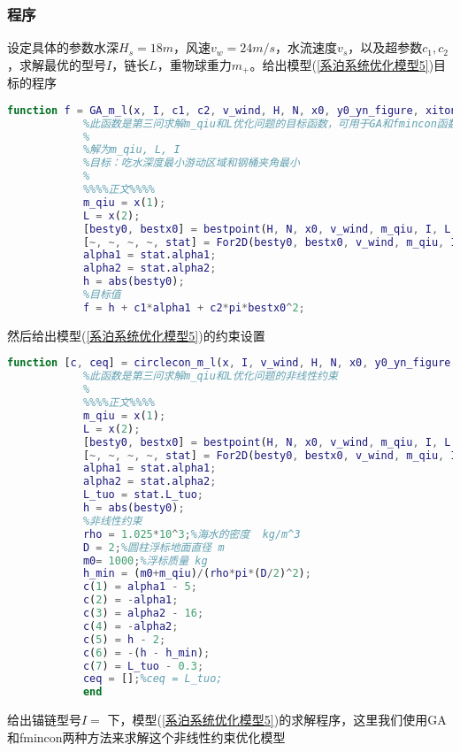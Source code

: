         \subsubsection{程序}
            \par
            设定具体的参数水深$H_s=18m$，风速$v_w=24m/s$，水流速度$v_s$，以及超参数$c_1,c_2$，求解最优的型号$I$，链长$L$，重物球重力$m_+$。给出模型(\ref{系泊系统优化模型5})目标的程序
            \begin{lstlisting}[language = Matlab]
            function f = GA_m_l(x, I, c1, c2, v_wind, H, N, x0, y0_yn_figure, xitong_figure)
            %此函数是第三问求解m_qiu和L优化问题的目标函数，可用于GA和fmincon函数。
            %
            %解为m_qiu, L, I
            %目标：吃水深度最小游动区域和钢桶夹角最小
            %
            %%%%正文%%%%
            m_qiu = x(1);
            L = x(2);
            [besty0, bestx0] = bestpoint(H, N, x0, v_wind, m_qiu, I, L, y0_yn_figure);
            [~, ~, ~, ~, stat] = For2D(besty0, bestx0, v_wind, m_qiu, I, L, xitong_figure);
            alpha1 = stat.alpha1;
            alpha2 = stat.alpha2;
            h = abs(besty0);
            %目标值
            f = h + c1*alpha1 + c2*pi*bestx0^2;
            \end{lstlisting}
            然后给出模型(\ref{系泊系统优化模型5})的约束设置
            \begin{lstlisting}[language = Matlab]
            function [c, ceq] = circlecon_m_l(x, I, v_wind, H, N, x0, y0_yn_figure, xitong_figure)
            %此函数是第三问求解m_qiu和L优化问题的非线性约束
            %
            %%%%正文%%%%
            m_qiu = x(1);
            L = x(2);
            [besty0, bestx0] = bestpoint(H, N, x0, v_wind, m_qiu, I, L, y0_yn_figure);
            [~, ~, ~, ~, stat] = For2D(besty0, bestx0, v_wind, m_qiu, I, L, xitong_figure);
            alpha1 = stat.alpha1;
            alpha2 = stat.alpha2;
            L_tuo = stat.L_tuo;
            h = abs(besty0);
            %非线性约束
            rho = 1.025*10^3;%海水的密度  kg/m^3
            D = 2;%圆柱浮标地面直径 m
            m0= 1000;%浮标质量 kg
            h_min = (m0+m_qiu)/(rho*pi*(D/2)^2);
            c(1) = alpha1 - 5;
            c(2) = -alpha1;
            c(3) = alpha2 - 16;
            c(4) = -alpha2;
            c(5) = h - 2;
            c(6) = -(h - h_min);
            c(7) = L_tuo - 0.3;
            ceq = [];%ceq = L_tuo;
            end
            \end{lstlisting}
            给出锚链型号$I =$ 下，模型(\ref{系泊系统优化模型5})的求解程序，这里我们使用GA和fmincon两种方法来求解这个非线性约束优化模型
